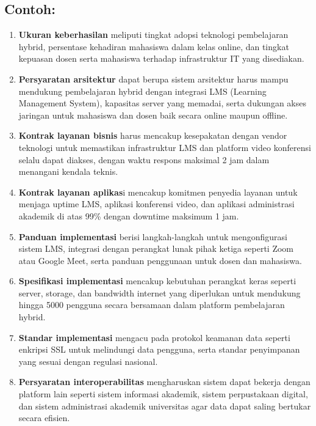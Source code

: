 \subsection{Contoh:}
\begin{enumerate}
	
\item
\textbf{Ukuran keberhasilan} meliputi tingkat adopsi teknologi pembelajaran hybrid, persentase kehadiran mahasiswa dalam kelas online, dan tingkat kepuasan dosen serta mahasiswa terhadap infrastruktur IT yang disediakan.

\item
\textbf{Persyaratan arsitektur} dapat berupa sistem arsitektur harus mampu mendukung pembelajaran hybrid dengan integrasi LMS (Learning Management System), kapasitas server yang memadai, serta dukungan akses jaringan untuk mahasiswa dan dosen baik secara online maupun offline.

\item
\textbf{Kontrak layanan bisnis }harus mencakup kesepakatan dengan vendor teknologi untuk memastikan infrastruktur LMS dan platform video konferensi selalu dapat diakses, dengan waktu respons maksimal 2 jam dalam menangani kendala teknis.

\item
\textbf{Kontrak layanan aplikas}i mencakup komitmen penyedia layanan untuk menjaga uptime LMS, aplikasi konferensi video, dan aplikasi administrasi akademik di atas 99\% dengan downtime maksimum 1 jam.

\item
\textbf{Panduan implementasi} berisi langkah-langkah untuk mengonfigurasi sistem LMS, integrasi dengan perangkat lunak pihak ketiga seperti Zoom atau Google Meet, serta panduan penggunaan untuk dosen dan mahasiswa.

\item
\textbf{Spesifikasi implementasi} mencakup kebutuhan perangkat keras seperti server, storage, dan bandwidth internet yang diperlukan untuk mendukung hingga 5000 pengguna secara bersamaan dalam platform pembelajaran hybrid.

\item
\textbf{Standar implementasi }mengacu pada protokol keamanan data seperti enkripsi SSL untuk melindungi data pengguna, serta standar penyimpanan yang sesuai dengan regulasi nasional.

\item
\textbf{Persyaratan interoperabilitas} mengharuskan sistem dapat bekerja dengan platform lain seperti sistem informasi akademik, sistem perpustakaan digital, dan sistem administrasi akademik universitas agar data dapat saling bertukar secara efisien.


\end{enumerate}
